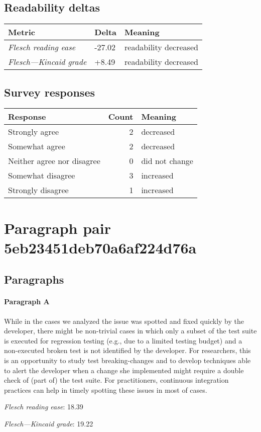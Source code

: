 \subsection{Readability deltas}

\begin{tabular}{lll}
\toprule
               \textbf{Metric} & \textbf{Delta} &       \textbf{Meaning} \\
\midrule
    \emph{Flesch reading ease} &         -27.02 &  readability decreased \\
 \emph{Flesch---Kincaid grade} &          +8.49 &  readability decreased \\
\bottomrule
\end{tabular}

\subsection{Survey responses}
\begin{tabular}{lrl}
\toprule
          \textbf{Response} &  \textbf{Count} & \textbf{Meaning} \\
\midrule
             Strongly agree &               2 &        decreased \\
             Somewhat agree &               2 &        decreased \\
 Neither agree nor disagree &               0 &   did not change \\
          Somewhat disagree &               3 &        increased \\
          Strongly disagree &               1 &        increased \\
\bottomrule
\end{tabular}

\section{Paragraph pair 5eb23451deb70a6af224d76a}
\subsection{Paragraphs}
\paragraph{Paragraph A}
While in the cases we analyzed the issue was spotted and fixed quickly by the developer, there might be non-trivial cases in which only a subset of the test suite is executed for regression testing (e.g., due to a limited testing budget) and a non-executed broken test is not identified by the developer. For researchers, this is an opportunity to study test breaking-changes and to develop techniques able to alert the developer when a change she implemented might require a double check of (part of) the test suite. For practitioners, continuous integration practices can help in timely spotting these issues in most of cases.\par\medskip
\emph{Flesch reading ease}: 18.39\par
\emph{Flesch---Kincaid grade}: 19.22

